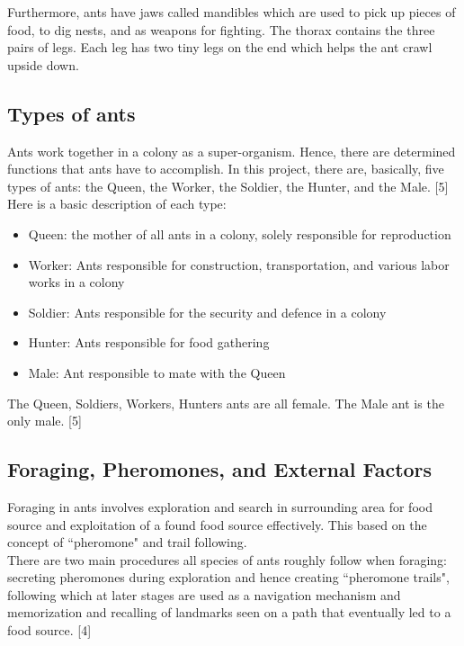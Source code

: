 \documentclass[titlepage, 12pt]{article}
\begin{document}
Furthermore, ants have jaws called mandibles which are used to pick up pieces of food, to dig nests, and as weapons for fighting. The thorax contains the three pairs of legs.  Each leg has two tiny legs on the end which helps the ant crawl upside down.  \\

\subsection{Types of ants}
Ants work together in a colony as a super-organism. Hence, there are determined functions that ants have to accomplish. In this project, there are, basically, five types of ants: the Queen, the Worker, the Soldier, the Hunter, and the Male. [5] Here is a basic description of each type: 

\begin{itemize}
\item Queen: the mother of all ants in a colony, solely responsible for reproduction 
\item Worker: Ants responsible for construction, transportation, and various labor works in a colony 
\item Soldier: Ants responsible for the security and defence in a colony
\item Hunter: Ants responsible for food gathering
\item Male: Ant responsible to mate with the Queen
\end{itemize}

The Queen, Soldiers, Workers, Hunters ants are all female. The Male ant is the only male. [5]

\subsection{Foraging, Pheromones, and External Factors}
Foraging in ants involves exploration and search in surrounding  area for food source and exploitation of a found food source effectively. This based on the concept of ``pheromone" and trail following. \\

There are two main procedures all species of ants roughly follow when foraging: secreting pheromones during exploration and hence creating ``pheromone trails", following which at later stages are used as a navigation mechanism and memorization and recalling of landmarks seen on a path that eventually led to a food source. [4]\\
\end{document}
